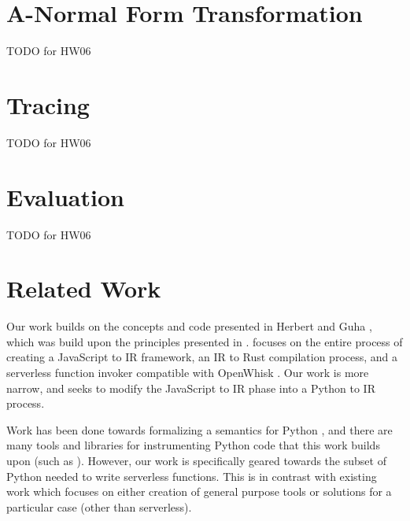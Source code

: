 \documentclass[acmsmall,review,authorversion]{acmart}
\begin{document}
\section{A-Normal Form Transformation}
\label{section:anf}

TODO for HW06


\section{Tracing}
\label{section:tracing}

TODO for HW06

\section{Evaluation}
\label{section:evaluation}

TODO for HW06

\section{Related Work}
\label{section:relwork}

Our work builds on the concepts and code presented in Herbert and Guha \cite{ServerlessAccel}, which was build upon the principles presented in \cite{FormalFoundations}. \cite{ServerlessAccel} focuses on the entire process of creating a JavaScript to IR framework, an IR to Rust compilation process, and a serverless function invoker compatible with OpenWhisk \cite{OpenWhisk}. Our work is more narrow, and seeks to modify the JavaScript to IR phase into a Python to IR process.


Work has been done towards formalizing a semantics for Python \cite{pyOpSem}, and there are many tools and libraries for instrumenting Python code that this work builds upon (such as \cite{rpython}). However, our work is specifically geared towards the subset of Python needed to write serverless functions. This is in contrast with existing work which focuses on either creation of general purpose tools or solutions for a particular case (other than serverless).
\end{document}
